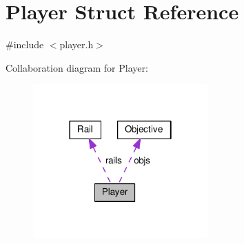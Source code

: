 \hypertarget{structPlayer}{\section{Player Struct Reference}
\label{structPlayer}
}


{\ttfamily \#include $<$player.\-h$>$}



Collaboration diagram for Player\-:
\nopagebreak
\begin{figure}[H]
\begin{center}
\leavevmode
\includegraphics[width=190pt]{structPlayer__coll__graph}
\end{center}
\end{figure}
